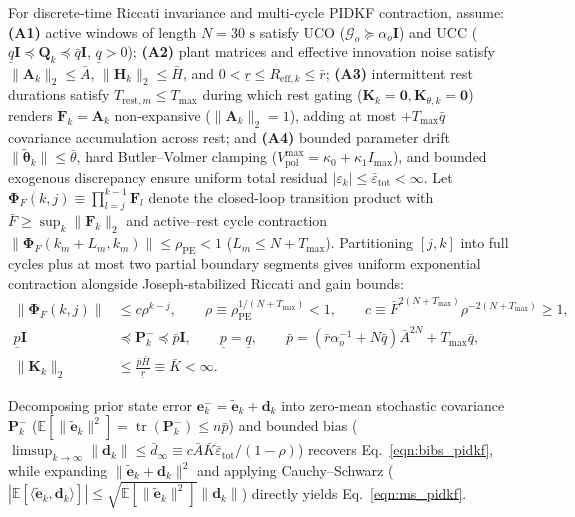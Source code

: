 \documentclass[11pt,a4paper]{article}
\begin{document}
{For discrete-time Riccati invariance and multi-cycle PIDKF contraction, assume: \textbf{(A1)} active windows of length $N = 30\text{ s}$ satisfy UCO ($\mathcal{G}_o \succeq \alpha_o \mathbf{I}$) and UCC ($\underline{q}\mathbf{I} \preceq \mathbf{Q}_k \preceq \bar{q}\mathbf{I}$, $\underline{q} > 0$); \textbf{(A2)} plant matrices and effective innovation noise satisfy $\|\mathbf{A}_k\|_2 \le \bar{A}$, $\|\mathbf{H}_k\|_2 \le \bar{H}$, and $0 < \underline{r} \le R_{\text{eff},k} \le \bar{r}$; \textbf{(A3)} intermittent rest durations satisfy $T_{\text{rest},m} \le T_{\max}$ during which rest gating ($\mathbf{K}_k = \mathbf{0}, \mathbf{K}_{\theta,k} = \mathbf{0}$) renders $\mathbf{F}_k = \mathbf{A}_k$ non-expansive ($\|\mathbf{A}_k\|_2 = 1$), adding at most $+T_{\max}\bar{q}$ covariance accumulation across rest; and \textbf{(A4)} bounded parameter drift $\|\tilde{\boldsymbol{\theta}}_k\| \le \bar{\theta}$, hard Butler--Volmer clamping ($V_{\text{pol}}^{\max} = \kappa_0 + \kappa_1 I_{\max}$), and bounded exogenous discrepancy ensure uniform total residual $|\varepsilon_k| \le \bar{\varepsilon}_{\text{tot}} < \infty$. Let $\boldsymbol{\Phi}_F(k, j) \equiv \prod_{l=j}^{k-1}\mathbf{F}_l$ denote the closed-loop transition product with $\bar{F} \ge \sup_k \|\mathbf{F}_k\|_2$ and active--rest cycle contraction $\|\boldsymbol{\Phi}_F(k_m + L_m, k_m)\| \le \rho_{\text{PE}} < 1$ ($L_m \le N + T_{\max}$). Partitioning $[j, k]$ into full cycles plus at most two partial boundary segments gives uniform exponential contraction alongside Joseph-stabilized Riccati and gain bounds:
\begin{align*}
\|\boldsymbol{\Phi}_F(k, j)\| &\le c\rho^{k-j}, \qquad
\rho \equiv \rho_{\text{PE}}^{1/(N + T_{\max})} < 1, \qquad
c \equiv \bar{F}^{2(N + T_{\max})} \rho^{-2(N + T_{\max})} \ge 1, \\
\underline{p}\mathbf{I} &\preceq \mathbf{P}_k^- \preceq \bar{p}\mathbf{I}, \qquad
\underline{p} = \underline{q}, \qquad \bar{p} = (\bar{r}\alpha_o^{-1} + N\bar{q})\bar{A}^{2N} + T_{\max}\bar{q}, \\
\|\mathbf{K}_k\|_2 &\le \frac{\bar{p}\bar{H}}{\underline{r}} \equiv \bar{K} < \infty.
\end{align*}\par}
Decomposing prior state error $\mathbf{e}_k^- = \tilde{\mathbf{e}}_k + \mathbf{d}_k$ into zero-mean stochastic covariance $\mathbf{P}_k^-$ ($\mathbb{E}[\|\tilde{\mathbf{e}}_k\|^2] = \operatorname{tr}(\mathbf{P}_k^-) \le n\bar{p}$) and bounded bias ($\limsup_{k\to\infty}\|\mathbf{d}_k\| \le \bar{d}_\infty \equiv c\bar{A}\bar{K}\bar{\varepsilon}_{\text{tot}}/(1-\rho)$) recovers Eq.~\eqref{eqn:bibs_pidkf}, while expanding $\|\tilde{\mathbf{e}}_k + \mathbf{d}_k\|^2$ and applying Cauchy--Schwarz ($|\mathbb{E}[\langle \tilde{\mathbf{e}}_k, \mathbf{d}_k \rangle]| \le \sqrt{\mathbb{E}[\|\tilde{\mathbf{e}}_k\|^2]}\|\mathbf{d}_k\|$) directly yields Eq.~\eqref{eqn:ms_pidkf}.

{


}
\end{document}
